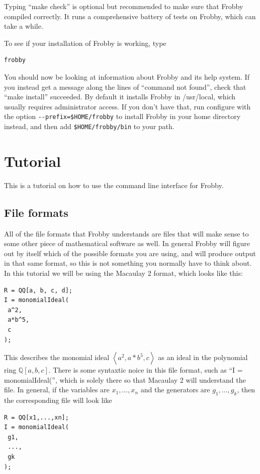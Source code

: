 \documentclass{amsart}
\theoremstyle{definition}
\newcommand{\Q}{\mathbb{Q}}
\newcommand{\ideal}[1]{\left<#1\right>}
\begin{document}
Typing ``make check'' is optional but recommended to make sure that
Frobby compiled correctly. It runs a comprehensive battery of tests
on Frobby, which can take a while.

To see if your installation of Frobby is working, type
\begin{verbatim}
frobby
\end{verbatim}
You should now be looking at information about Frobby and its help
system. If you instead get a message along the lines of ``command not
found'', check that ``make install'' succeeded. By default it installs
Frobby in /usr/local, which usually requires administrator access. If
you don't have that, run configure with the option
\verb|--prefix=$HOME/frobby| to install Frobby in your home directory
instead, and then add \verb|$HOME/frobby/bin| to your path.

\section{Tutorial}

This is a tutorial on how to use the command line interface for
Frobby.

\subsection{File formats}

All of the file formats that Frobby understands are files that will
make sense to some other piece of mathematical software as well. In
general Frobby will figure out by itself which of the possible formats
you are using, and will produce output in that same format, so this is
not something you normally have to think about. In this tutorial we
will be using the Macaulay 2 format, which looks like this:
\begin{verbatim}
R = QQ[a, b, c, d];
I = monomialIdeal(
 a^2,
 a*b^5,
 c
);
\end{verbatim}
This describes the monomial ideal $\ideal{a^2,a*b^5,c}$ as an ideal in
the polynomial ring $\Q[a,b,c]$. There is some syntaxtic noice in this
file format, such as ``I = monomialIdeal('', which is solely there so
that Macaulay 2 will understand the file. In general, if the variables
are $x_1,\ldots,x_n$ and the generators are $g_1,\ldots,g_k$, then the
corresponding file will look like
\begin{verbatim}
R = QQ[x1,...,xn];
I = monomialIdeal(
 g1,
 ...,
 gk
);
\end{verbatim}
\end{document}
